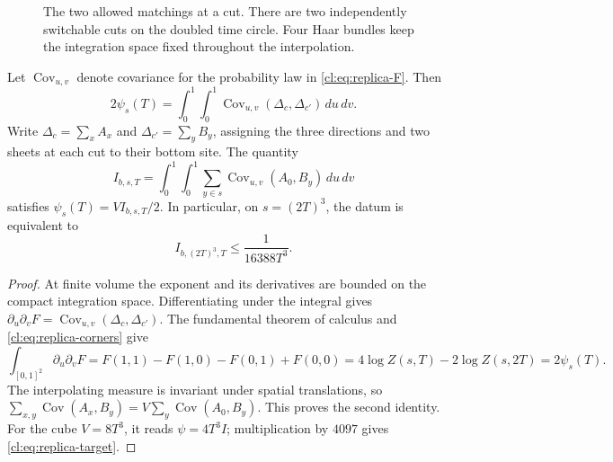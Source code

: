 \begin{figure}[htbp]
\centering
{}
\caption{The two allowed matchings at a cut. There are two independently
switchable cuts on the doubled time circle. Four Haar bundles keep the
integration space fixed throughout the interpolation.}
\label{cl:fig:seams}
\end{figure}

\begin{proposition}\label{cl:prop:replica}
Let $\operatorname{Cov}_{u,v}$ denote covariance for the probability law
in \eqref{cl:eq:replica-F}. Then
\begin{equation}\label{cl:eq:replica-covariance}
2\psi_s(T)=\int_0^1\!\int_0^1
          \operatorname{Cov}_{u,v}(\Delta_c,\Delta_{c'})\,du\,dv.
\end{equation}
Write $\Delta_c=\sum_x A_x$ and $\Delta_{c'}=\sum_y B_y$, assigning
the three directions and two sheets at each cut to their bottom site.
The quantity
\[
I_{b,s,T}=\int_0^1\!\int_0^1\sum_{y\in s}
                  \operatorname{Cov}_{u,v}(A_0,B_y)\,du\,dv
\]
satisfies $\psi_s(T)=VI_{b,s,T}/2$. In particular, on $s=(2T)^3$,
the datum \Mcirc{} is equivalent to
\begin{equation}\label{cl:eq:replica-target}
I_{b,(2T)^3,T}\le\frac1{16388T^3}.
\end{equation}
\end{proposition}
\begin{proof}
At finite volume the exponent and its derivatives are bounded on the
compact integration space. Differentiating under the integral gives
$\partial_u\partial_vF=\operatorname{Cov}_{u,v}(\Delta_c,\Delta_{c'})$.
The fundamental theorem of calculus and \eqref{cl:eq:replica-corners}
give
\[
\int_{[0,1]^2}\partial_u\partial_vF
=F(1,1)-F(1,0)-F(0,1)+F(0,0)
=4\log Z(s,T)-2\log Z(s,2T)=2\psi_s(T).
\]
The interpolating measure is invariant under spatial translations, so
$\sum_{x,y}\operatorname{Cov}(A_x,B_y)
=V\sum_y\operatorname{Cov}(A_0,B_y)$. This proves the second identity.
For the cube $V=8T^3$, it reads $\psi=4T^3I$; multiplication by
$4097$ gives \eqref{cl:eq:replica-target}.
\end{proof}

